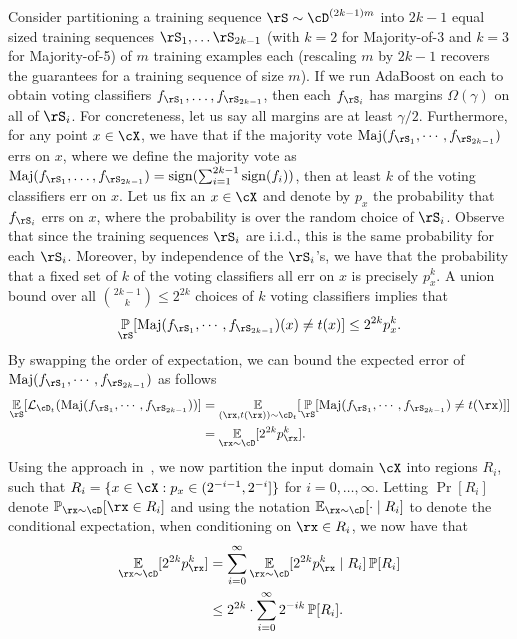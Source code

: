Consider partitioning a training sequence $\rS \sim \cD^{(2k-1)m}$ into $2k-1$ equal sized training sequences $\rS_1,\dots\rS_{2k-1}$ (with $k=2$ for Majority-of-3 and $k=3$ for Majority-of-5) of $m$ training examples each (rescaling $m$ by $2k-1$ recovers the guarantees for a training sequence of size $m$). If we run AdaBoost on each to obtain voting classifiers $f_{\rS_1},\dots,f_{\rS_{2k-1}}$, then each $f_{\rS_i}$ has margins $\Omega(\gamma)$ on all of $\rS_i$. For concreteness, let us say all margins are at least $\gamma/2$. Furthermore, for any point $x \in \cX$, we have that if the majority vote $\maj(f_{\rS_{1}},\cdots,f_{\rS_{2k-1}})$ errs on $x$, where we define the majority vote as $ \maj(f_{\rS_{1}},\ldots,f_{\rS_{2k-1}})=\sign(\sum_{i=1}^{2k-1}\sign(f_{i})) $, then at least $k$ of the voting classifiers err on $x$. Let us fix an $x \in \cX$ and denote by $p_x$ the probability that $f_{\rS_i}$ errs on $x$, where the probability is over the random choice of $\rS_i$. Observe that since the training sequences $\rS_i$ are i.i.d., this is the same probability for each $\rS_i$. Moreover, by independence of the $\rS_i$'s, we have that the probability that a fixed set of $k$ of the voting classifiers all err on $x$ is precisely $p_x^k$. A union bound over all $\binom{2k-1}{k} \leq 2^{2k}$ choices of $k$ voting classifiers implies that
\[
  \Pr_{\rS}[\maj(f_{\rS_{1}},\cdots,f_{\rS_{2k-1}})(x) \neq t(x)] \leq 2^{2k} p_x^k.
\]
By swapping the order of expectation, we can bound the expected error of $\maj(f_{\rS_{1}},\cdots,f_{\rS_{2k-1}})$ as follows
\begin{align*}
  \e_{\rS}[\ls_{\cD_t}(\maj(f_{\rS_{1}},\cdots,f_{\rS_{2k-1}}))] &=\e_{(\rx,t(\rx)) \sim \cD_t}[\Pr_{\rS}[ \maj(f_{\rS_{1}},\cdots,f_{\rS_{2k-1}})\neq t(\rx)]] \\
  &=\e_{\rx \sim \cD}[2^{2k} p_\rx^k].
\end{align*}
Using the approach in~\cite{majorityofthree}, we now partition the input domain $\cX$ into regions $R_i$, such that $R_i = \{x \in \cX : p_x \in (2^{-i-1}, 2^{-i}]\}$ for $i=0,\dots,\infty$. Letting $\Pr[R_i]$ denote $\Pr_{\rx \sim \cD}[\rx \in R_i]$ and using the notation $\e_{\rx \sim \cD}[ \cdot \mid R_i]$ to denote the conditional expectation, when conditioning on $\rx \in R_i$, we now have that
\begin{align}
  \e_{\rx \sim \cD}[2^{2k} p_\rx^k] &= \sum_{i=0}^\infty \e_{\rx \sim \cD}[2^{2k} p_\rx^k \mid R_i] \Pr[R_i] \nonumber\\
  &\leq 2^{2k} \cdot \sum_{i=0}^\infty 2^{-ik} \Pr[R_i].\label{eq:boundexp}
\end{align}
